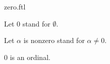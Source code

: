 \documentclass{naproche-library}
\begin{document}
\begin{smodule}[title=The number $0$]{zero.ftl}

\begin{forthel}
  Let $0$ stand for $\emptyset$.

  Let $\alpha$ is nonzero stand for $\alpha \neq 0$.
\end{forthel}

\begin{proposition}[forthel,id=SET_THEORY_02_8483196888940544]
  $0$ is an ordinal.
\end{proposition}
\end{smodule}
\end{document}
